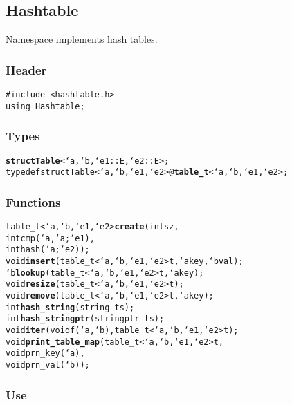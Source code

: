 \subsection{Hashtable}

Namespace  implements hash tables.

\subsubsection*{Header}
\begin{verbatim}
#include <hashtable.h>
using Hashtable;
\end{verbatim}

\subsubsection*{Types}
\begin{alltt}
\textbf{struct Table}<`a,`b,`e1::E,`e2::E>;
typedef struct Table<`a,`b,`e1,`e2> @\textbf{table_t}<`a,`b,`e1,`e2>;
\end{alltt}

\subsubsection*{Functions}

\begin{alltt}
table_t<`a,`b,`e1,`e2> \textbf{create}(int sz,
                              int cmp(`a,`a;`e1),
                              int hash(`a;`e2));
void                   \textbf{insert}(table_t<`a,`b,`e1,`e2> t, `a key, `b val);
`b                     \textbf{lookup}(table_t<`a,`b,`e1,`e2> t, `a key);
void                   \textbf{resize}(table_t<`a,`b,`e1,`e2> t);
void                   \textbf{remove}(table_t<`a,`b,`e1,`e2> t, `a key);
int                    \textbf{hash_string}(string_t s);
int                    \textbf{hash_stringptr}(stringptr_t s);
void                   \textbf{iter}(void f(`a,`b), table_t<`a,`b,`e1,`e2> t);
void                   \textbf{print_table_map}(table_t<`a,`b,`e1,`e2> t,
                                       void prn_key(`a), 
                                       void prn_val(`b));
\end{alltt}

\subsubsection*{Use}

